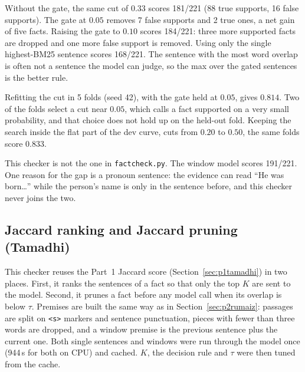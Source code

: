 \documentclass[12pt,a4paper]{article}
\begin{document}
Without the gate, the same cut of $0.33$ scores 181/221 (88 true supports, 16 false supports). The gate at $0.05$ removes 7 false supports and 2 true ones, a net gain of five facts. Raising the gate to $0.10$ scores 184/221: three more supported facts are dropped and one more false support is removed. Using only the single highest-BM25 sentence scores 168/221. The sentence with the most word overlap is often not a sentence the model can judge, so the max over the gated sentences is the better rule.

Refitting the cut in 5 folds (seed 42), with the gate held at $0.05$, gives $0.814$. Two of the folds select a cut near $0.05$, which calls a fact supported on a very small probability, and that choice does not hold up on the held-out fold. Keeping the search inside the flat part of the dev curve, cuts from $0.20$ to $0.50$, the same folds score $0.833$.

This checker is not the one in \texttt{factcheck.py}. The window model scores 191/221. One reason for the gap is a pronoun sentence: the evidence can read ``He was born\ldots'' while the person's name is only in the sentence before, and this checker never joins the two.

\subsection{Jaccard ranking and Jaccard pruning (Tamadhi)}
\label{sec:p2tamadhi}
This checker reuses the Part~1 Jaccard score (Section~\ref{sec:p1tamadhi}) in two places. First, it ranks the sentences of a fact so that only the top $K$ are sent to the model. Second, it prunes a fact before any model call when its overlap is below $\tau$. Premises are built the same way as in Section~\ref{sec:p2rumaiz}: passages are split on \texttt{<s>} markers and sentence punctuation, pieces with fewer than three words are dropped, and a window premise is the previous sentence plus the current one. Both single sentences and windows were run through the model once (944\,s for both on CPU) and cached. $K$, the decision rule and $\tau$ were then tuned from the cache.
\end{document}
